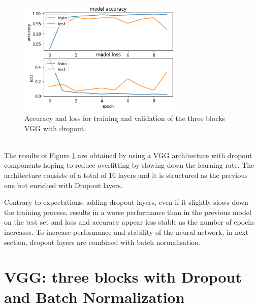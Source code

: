 \documentclass[10pt,english, openany]{book}
\begin{document}
\begin{figure}[H]
    \centering
    \includegraphics[width=0.7\textwidth]{Images/2.5 Accuracy Loss VGG 3 Dropout.png}
    \caption{\label{fig:5.7}Accuracy and loss for training and validation of the three blocks VGG with dropout.}
\end{figure}
\noindent \\ The results of Figure \ref{fig:5.7} are obtained by using a VGG architecture with dropout components hoping to reduce overfitting by slowing down the learning rate. The architecture consists of a total of 16 layers and it is structured as the previous one but enriched with Dropout layers.

Contrary to expectations, adding dropout layers, even if it slightly slows down the training process, results in a worse performance than in the previous model on the test set and loss and accuracy appear less stable as the number of epochs increases. To increase performance and stability of the neural network, in next section, dropout layers are combined with batch normalisation.
\newpage
\section{VGG: three blocks with Dropout and Batch Normalization}
\end{document}
